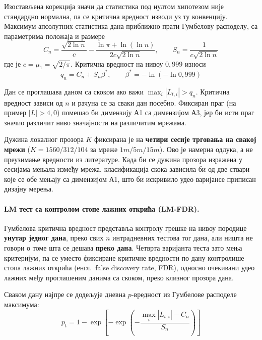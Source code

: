 Изостављена корекција значи да статистика под нултом хипотезом није стандардно
нормална, па се критична вредност изводи уз ту конвенцију. Максимум апсолутних
статистика дана приближно прати Гумбелову расподелу, са параметрима положаја и размере
\begin{equation}
C_n = \frac{\sqrt{2\ln n}}{c} - \frac{\ln\pi + \ln(\ln n)}{2c\sqrt{2\ln n}},
\qquad
S_n = \frac{1}{c\sqrt{2\ln n}}
\end{equation}
где је $c = \mu_1 = \sqrt{2/\pi}$. Критична вредност на нивоу $0{,}999$ износи
\begin{equation}
q_n = C_n + S_n\beta^{*},
\qquad
\beta^{*} = -\ln\!\left(-\ln 0{,}999\right)
\end{equation}

Дан се проглашава даном са скоком ако важи $\max_i |L_{t,i}| > q_n$. Критична
вредност зависи од $n$ и рачуна се за сваки дан посебно. Фиксиран праг (на пример
$|L| > 4{,}0$) помешао би димензију А1 са димензијом А3, јер би исти праг значио различит
ниво значајности на различитим мрежама.

Дужина локалног прозора $K$ фиксирана је на \textbf{четири сесије трговања на свакој
мрежи} ($K = 1560/312/104$ за мреже $1m/5m/15m$). Ово је намерна одлука, а не
преузимање вредности из литературе. Када би се дужина прозора изражена у сесијама
мењала између мрежа, класификација скока зависила би од две ствари које се обе мењају
са димензијом А1, што би искривило удео варијансе приписан дизајну мерења.

\paragraph{LM тест са контролом стопе лажних открића (LM-FDR).}
Гумбелова критична вредност представља контролу грешке на нивоу породице
\textbf{унутар једног дана}, преко свих $n$ интрадневних тестова тог дана, али ништа
не говори о томе шта се дешава \textbf{преко дана}. Четврта варијанта теста зато мења
критеријум, па се уместо фиксиране критичне вредности по дану контролише стопа лажних
открића (енгл.\ false discovery rate, FDR), односно очекивани удео лажних међу
проглашеним данима са скоком, преко клизног прозора дана.

Сваком дану најпре се додељује дневна $p$-\hspace{0pt}вредност из Гумбелове
расподеле максимума:
\begin{equation}
p_t = 1 - \exp\!\left[-\exp\!\left(-\frac{\max_i|L_{t,i}| - C_n}{S_n}\right)\right]
\end{equation}


